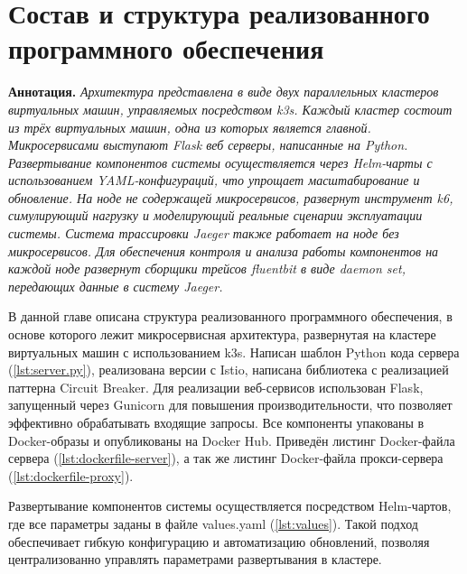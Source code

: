 

\section{Состав и структура реализованного программного обеспечения}

\textbf{Аннотация. } \textit{Архитектура представлена в виде двух параллельных кластеров виртуальных машин, управляемых посредством k3s. Каждый кластер состоит из трёх виртуальных машин, одна из которых является главной. Микросервисами выступают Flask веб серверы, написанные на Python.  Развертывание компонентов системы осуществляется через Helm-чарты с использованием YAML-конфигураций, что упрощает масштабирование и обновление. На ноде не содержащей микросервисов, развернут инструмент k6, симулирующий нагрузку и моделирующий реальные сценарии эксплуатации системы.  Система трассировки Jaeger также работает на ноде без микросервисов. Для обеспечения контроля и анализа работы компонентов на каждой ноде развернут сборщики трейсов fluentbit в виде daemon set, передающих данные в систему Jaeger. }

В данной главе описана структура реализованного программного обеспечения, в основе которого лежит микросервисная архитектура, развернутая на кластере виртуальных машин с использованием k3s. Написан шаблон Python кода сервера (\ref{lst:server.py}), реализована версии с Istio, написана библиотека с реализацией паттерна Circuit Breaker. Для реализации веб-сервисов использован Flask, запущенный через Gunicorn для повышения производительности, что позволяет эффективно обрабатывать входящие запросы. Все компоненты упакованы в Docker-образы и опубликованы на Docker Hub. Приведён листинг Docker-файла сервера (\ref{lst:dockerfile-server}), а так же листинг Docker-файла прокси-сервера (\ref{lst:dockerfile-proxy}).

Развертывание компонентов системы осуществляется посредством Helm-чартов, где все параметры заданы в файле values.yaml (\ref{lst:values}). Такой подход обеспечивает гибкую конфигурацию и автоматизацию обновлений, позволяя централизованно управлять параметрами развертывания в кластере. 


